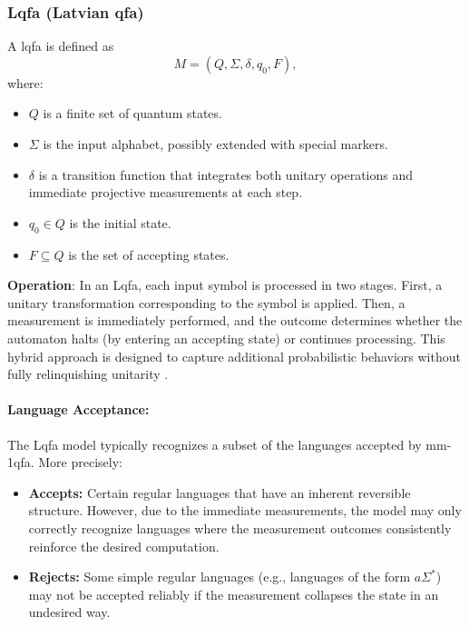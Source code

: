 \subsubsection{Lqfa (Latvian qfa)}
\label{sssec:lqfa}
\begin{definition}[Lqfa]
A \gls{lqfa} is defined as 
\[
M = (Q, \Sigma, \delta, q_0, F),
\]
where:
\begin{itemize}
    \item \( Q \) is a finite set of quantum states.
    \item \( \Sigma \) is the input alphabet, possibly extended with special markers.
    \item \( \delta \) is a transition function that integrates both unitary operations and immediate projective measurements at each step.
    \item \( q_0 \in Q \) is the initial state.
    \item \( F \subseteq Q \) is the set of accepting states.
\end{itemize}
\end{definition}

\textbf{Operation}:  
In an Lqfa, each input symbol is processed in two stages. First, a unitary transformation corresponding to the symbol is applied. Then, a measurement is immediately performed, and the outcome determines whether the automaton halts (by entering an accepting state) or continues processing. This hybrid approach is designed to capture additional probabilistic behaviors without fully relinquishing unitarity \cite{ambainis2002quantum}.

\paragraph{Language Acceptance:}  
The Lqfa model typically recognizes a subset of the languages accepted by \gls{mm-1qfa}. More precisely:
\begin{itemize}
    \item \textbf{Accepts:} Certain regular languages that have an inherent reversible structure. However, due to the immediate measurements, the model may only correctly recognize languages where the measurement outcomes consistently reinforce the desired computation.
    \item \textbf{Rejects:} Some simple regular languages (e.g., languages of the form \( a\Sigma^* \)) may not be accepted reliably if the measurement collapses the state in an undesired way.
\end{itemize}

